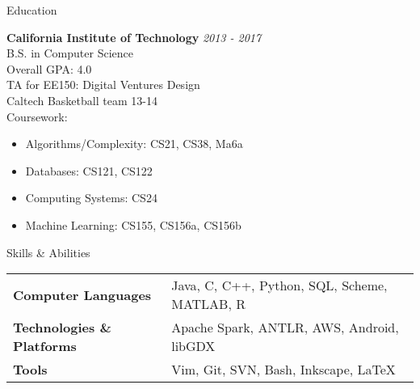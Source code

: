 \documentclass{resume} %
\begin{document}

\begin{rSection}{Education}

{\bf California Institute of Technology} \hfill {\em 2013 - 2017} \\
B.S. in Computer Science  \\
Overall GPA: 4.0 \smallskip \\
TA for EE150: Digital Ventures Design \\
Caltech Basketball team 13-14 \smallskip \\
Coursework:
\vspace{-5.0mm}
\begin{minipage}{0.43\linewidth}
\begin{itemize}
\item{Algorithms/Complexity: CS21, CS38, Ma6a}
\item{Databases: CS121, CS122}
\end{itemize}
\end{minipage}
\begin{minipage}{0.43\linewidth}
\begin{itemize}
\item{Computing Systems: CS24}
\item{Machine Learning: CS155, CS156a, CS156b}
\end{itemize}
\end{minipage}
\vspace{5mm}
\end{rSection}


\begin{rSection}{Skills \& Abilities}

\begin{tabularx}{\textwidth}{@{}lX}
    \bfseries{Computer Languages}   &  Java, C, C++, Python, SQL, Scheme, MATLAB, R \\
    \bfseries{Technologies \& Platforms}   &  Apache Spark, ANTLR, AWS, Android, libGDX \\
    \bfseries{Tools}   &  Vim, Git, SVN, Bash, Inkscape, \LaTeX \\
\end{tabularx}

\end{rSection}
\end{document}
